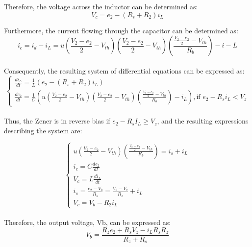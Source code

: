 Therefore, the voltage across the inductor can be determined as:\\

\begin{equation}
    V_c=e_2-(R_s+R_2)i_L
\end{equation}

Furthermore, the current flowing through the capacitor can be determined as:\\

\begin{equation}
    i_c=i_d-i_L=u(\frac{V_2-e_2}{2}-V_{th})(\frac{V_2-e_2}{2}-V_{th})(\frac{\frac{V_2-e_2}{2}-V_{th}}{R_b})-i-L
\end{equation}\\

Consequently, the resulting system of differential equations can be expressed as:\\

\begin{equation}
    \begin{cases}
        \frac{di_L}{dt}=\frac{1}{L}(e_2-(R_s+R_2)i_L)\\
        \frac{de_2}{dt}=\frac{1}{C}\left(u\left(\frac{V_2-e_2}{2}-V_{th}\right)\left(\frac{V_2-e_2}{2}-V_{th}\right)\left(\frac{\frac{V_2-e_2}{2}-V_{th}}{R_b}\right)-i_L\right), \text{if } e_2-R_si_L<V_z
    \end{cases}
\end{equation}\\

Thus, the Zener is in reverse bias if $e_2 - R_sI_L \geq V_z$, and the resulting expressions describing the system are:

\begin{equation}
    \begin{cases}
        u(\frac{V_2-e_2}{2}-V_{th})(\frac{\frac{V_2-e_2}{2}-V_{th}}{R_b})=i_s+i_L\\
        i_c=C\frac{de_2}{dt}\\
        V_c=L\frac{di_L}{dt}\\
        i_s=\frac{e_2-V_b}{R_s}=\frac{V_b-V_z}{R_z}+i_L\\
        V_c=V_b-R_2i_L
    \end{cases}
\end{equation}\\

Therefore, the output voltage, Vb, can be expressed as:\\

\begin{equation}
    V_b=\frac{R_ze_2+R_sV_z-i_LR_sR_z}{R_z+R_s}
\end{equation}\\

